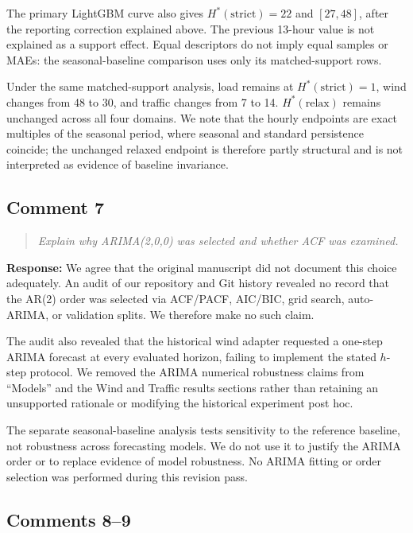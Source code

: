 \documentclass[11pt,a4paper]{article}
\let\originalsubsection\subsection
\renewcommand{\subsection}{\Needspace{9\baselineskip}\originalsubsection}
\newenvironment{reviewcomment}
  {\begin{quote}\itshape}
  {\end{quote}}
\newcommand{\response}{\noindent\textbf{Response:} }
\begin{document}
The primary LightGBM curve also gives $H^*(\mathrm{strict})=22$ and
$[27,48]$, after the reporting correction explained above. The previous
13-hour value is not explained as a support effect. Equal descriptors
do not imply equal samples or MAEs: the seasonal-baseline comparison
uses only its matched-support rows.

Under the same matched-support analysis, load remains at
$H^*(\mathrm{strict})=1$, wind changes from 48 to 30, and traffic changes from
7 to 14. $H^*(\mathrm{relax})$ remains unchanged across all four domains. We
note that the hourly endpoints are exact multiples of the seasonal period,
where seasonal and standard persistence coincide; the unchanged relaxed
endpoint is therefore partly structural and is not interpreted as evidence of
baseline invariance.


\subsection*{Comment 7}

\begin{reviewcomment}
Explain why ARIMA(2,0,0) was selected and whether ACF was examined.
\end{reviewcomment}

\response
We agree that the original manuscript did not document this choice adequately.
An audit of our repository and Git history revealed no record that the AR(2)
order was selected via ACF/PACF, AIC/BIC, grid search, auto-ARIMA, or validation
splits. We therefore make no such claim.

The audit also revealed that the historical wind adapter requested a one-step
ARIMA forecast at every evaluated horizon, failing to implement the stated
$h$-step protocol. We removed the ARIMA numerical robustness claims from
``Models'' and the Wind and Traffic results sections rather than retaining an
unsupported rationale or modifying the historical experiment post hoc.

The separate seasonal-baseline analysis tests sensitivity to the reference
baseline, not robustness across forecasting models. We do not use it to
justify the ARIMA order or to replace evidence of model robustness. No
ARIMA fitting or order selection was performed during this revision pass.


\subsection*{Comments 8--9}
\end{document}
